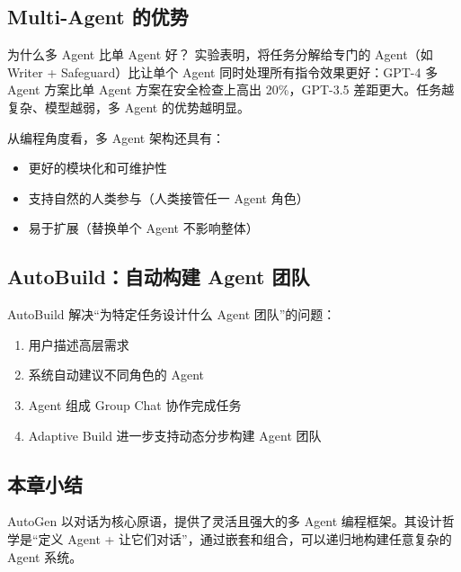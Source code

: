 \subsection{Multi-Agent 的优势}

\begin{importantbox}{为什么多 Agent 比单 Agent 好？}
实验表明，将任务分解给专门的 Agent（如 Writer + Safeguard）比让单个 Agent 同时处理所有指令效果更好：GPT-4 多 Agent 方案比单 Agent 方案在安全检查上高出 20\%，GPT-3.5 差距更大。任务越复杂、模型越弱，多 Agent 的优势越明显。
\end{importantbox}

从编程角度看，多 Agent 架构还具有：
\begin{itemize}
    \item 更好的模块化和可维护性
    \item 支持自然的人类参与（人类接管任一 Agent 角色）
    \item 易于扩展（替换单个 Agent 不影响整体）
\end{itemize}

\subsection{AutoBuild：自动构建 Agent 团队}

AutoBuild 解决``为特定任务设计什么 Agent 团队''的问题：
\begin{enumerate}
    \item 用户描述高层需求
    \item 系统自动建议不同角色的 Agent
    \item Agent 组成 Group Chat 协作完成任务
    \item Adaptive Build 进一步支持动态分步构建 Agent 团队
\end{enumerate}

\subsection{本章小结}

AutoGen 以对话为核心原语，提供了灵活且强大的多 Agent 编程框架。其设计哲学是``定义 Agent + 让它们对话''，通过嵌套和组合，可以递归地构建任意复杂的 Agent 系统。

